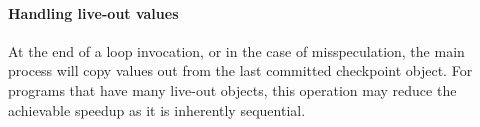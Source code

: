 

\paragraph{Handling live-out values}
At the end of a loop invocation, or in the case of misspeculation, the main
process will copy values out from the last committed checkpoint object. For
programs that have many live-out objects, this operation may reduce the
achievable speedup as it is inherently sequential.





%
